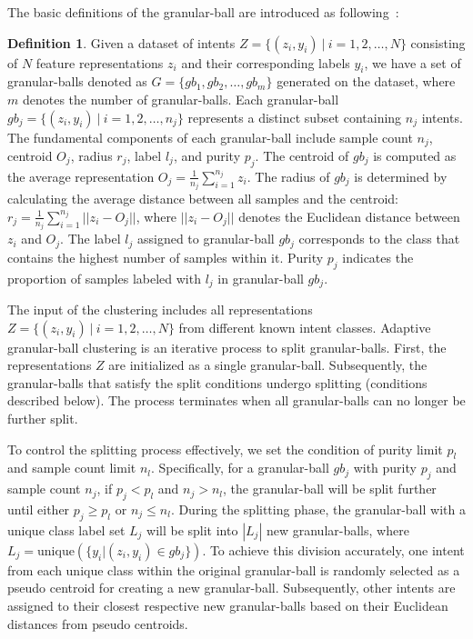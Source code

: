 \documentclass[letterpaper]{article} %
\theoremstyle{definition}
\newtheorem{definition}{\bf Definition}
\begin{document}
The basic definitions of the granular-ball are introduced as following~\cite{xia2021granular}:
\begin{definition}
Given a dataset of intents $Z=\{(z_i, y_i) \ |\  i=1, 2, \ldots,N\}$ consisting of $N$ feature representations $z_i$ and their corresponding labels $y_i$, we have a set of granular-balls denoted as $G = \{gb_1, gb_2, \ldots,  gb_m\}$ generated on the dataset, where $m$ denotes the number of granular-balls.
Each granular-ball $gb_j = \{(z_i, y_i)\ | \ i = 1, 2, \ldots, n_j\}$ represents a distinct subset containing $n_j$ intents. 
The fundamental components of each granular-ball include sample count $n_j$, centroid $O_j$, radius $r_j$, label $l_j$, and purity $p_j$.
The centroid of $gb_j$ is computed as the average representation $O_j = \frac{1}{n_j} \sum_{i=1}^{n_j} z_i$. 
The radius of $gb_j$ is determined by calculating the average distance between all samples and the centroid: $r_j = \frac{1}{n_j} \sum_{i=1}^{n_j} ||z_i - O_j||$, where $||z_i - O_j||$ denotes the Euclidean distance between $z_i$ and $O_j$.
The label $l_j$ assigned to granular-ball $gb_j$ corresponds to the class that contains the highest number of samples within it.
Purity $p_j$ indicates the proportion of samples labeled with $l_j$ in granular-ball $gb_j$.
\end{definition}

The input of the clustering includes all representations $Z = \{(z_i, y_i) \ |\  i = 1, 2, \ldots, N\}$ from different known intent classes. 
Adaptive granular-ball clustering is an iterative process to split granular-balls. 
First, the representations $Z$ are initialized as a single granular-ball. Subsequently, the granular-balls that satisfy the split conditions undergo splitting (conditions described below). The process terminates when all granular-balls can no longer be further split.

To control the splitting process effectively, we set the condition of purity limit $p_l$ and sample count limit $n_l$.
Specifically, for a granular-ball $gb_j$ with purity $p_j$ and sample count $n_j$, if $p_j<p_l$ and $n_j>n_l$, the granular-ball will be split further until either $p_j \ge p_l$ or $n_j \le n_l$. 
During the splitting phase, the granular-ball with a unique class label set $L_j$ will be split into $|L_j|$ new granular-balls, where $L_j=\text{unique}(\{y_i | (z_i,y_i) \in gb_j\})$. 
To achieve this division accurately, one intent from each unique class within the original granular-ball is randomly selected as a pseudo centroid for creating a new granular-ball.
Subsequently, other intents are assigned to their closest respective new granular-balls based on their Euclidean distances from pseudo centroids.
\end{document}
